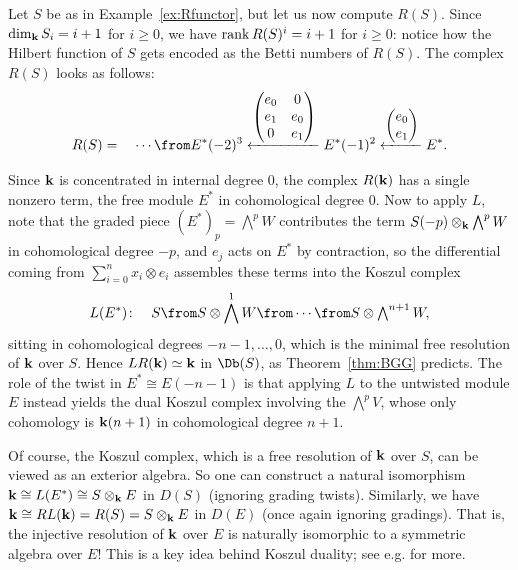 \documentclass{amsart}
\begin{document}
\begin{example}
  Let $S$ be as in Example~\ref{ex:Rfunctor}, but let us now compute $R(S)$. Since $\dim_{\mathbf{k}} S_i = i +1$ for $i \ge 0$, we have $\operatorname{rank} R(S)^{i} = i+1$ for $i \ge 0$: notice how the Hilbert function of $S$ gets encoded as the Betti numbers of $R(S)$. The complex $R(S)$ looks as follows:
  $$
  R(S) = \quad \cdots \from E^*(-2)^3\xla{\begin{pmatrix} e_0 & 0 \\ e_1 & e_0 \\ 0 & e_1\end{pmatrix}} E^*(-1)^2 \xla{\begin{pmatrix} e_0 \\ e_1 \end{pmatrix}}  E^*.
  $$
\end{example}

\begin{example}\label{ex:BGGresidue}
  Since ${\bf k}$ is concentrated in internal degree $0$, the complex $R({\bf k})$ has a single nonzero term, the free module $E^*$ in cohomological degree $0$. Now to apply $L$, note that the graded piece $(E^*)_p =\bigwedge^p W$ contributes the term $S(-p) \otimes_{\bf k}\bigwedge^p W$ in cohomological degree $-p$, and $e_j$ acts on $E^*$ by contraction, so the differential coming from $\sum_{i = 0}^n x_i\otimes e_i$ assembles these terms into the Koszul complex 
  \[  L(E^*)\colon\quad S\from S\otimes\bigwedge^1 W\from \cdots\from S\otimes\textstyle\bigwedge^{n+1}W,  \]
  sitting in cohomological degrees $-n-1, \dots, 0$, which is the minimal free resolution of ${\bf k}$ over $S$. Hence $LR({\bf k})\simeq {\bf k}$ in $\Db(S)$, as Theorem~\ref{thm:BGG} predicts. The role of the twist in $E^*\cong E(-n-1)$ is that applying $L$ to the untwisted module $E$ instead yields the dual Koszul complex involving the $\bigwedge^p V$, whose only cohomology is ${\bf k}(n+1)$ in cohomological degree $n+1$.

  Of course, the Koszul complex, which is a free resolution of ${\bf k}$ over $S$, can be viewed as an exterior algebra.  So one can construct a natural isomorphism ${\bf k} \cong L(E^*)\cong S\otimes_{{\bf k}} E$ in $D(S)$ (ignoring grading twists). Similarly, we have $\mathbf{k} \cong RL(\mathbf{k}) = R(S) = S \otimes_{\mathbf{k}} E$ in $D(E)$ (once again ignoring gradings). That is, the injective resolution of ${\bf k}$ over $E$ is naturally isomorphic to a symmetric algebra over $E$! This is a key idea behind Koszul duality; see e.g. \cite{PP05} for more.
\end{example}
\end{document}
